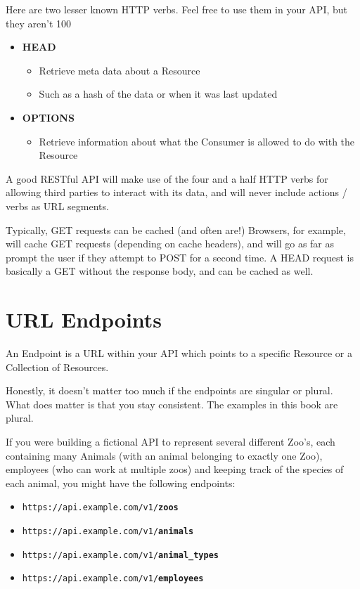 \documentclass{book}
\begin{document}
Here are two lesser known HTTP verbs. Feel free to use them in your API, but they aren't 100%

\begin{itemize}
\item \textbf{HEAD}
    \begin{itemize}
    \item Retrieve meta data about a Resource
    \item Such as a hash of the data or when it was last updated
    \end{itemize}
\item \textbf{OPTIONS}
    \begin{itemize}
    \item Retrieve information about what the Consumer is allowed to do with the Resource
    \end{itemize}
\end{itemize}

A good RESTful API will make use of the four and a half HTTP verbs for allowing third parties to interact with its data, and will never include actions / verbs as URL segments.

Typically, GET requests can be cached (and often are!) Browsers, for example, will cache GET requests (depending on cache headers), and will go as far as prompt the user if they attempt to POST for a second time. A HEAD request is basically a GET without the response body, and can be cached as well.


\chapter{URL Endpoints}

An Endpoint is a URL within your API which points to a specific Resource or a Collection of Resources.

Honestly, it doesn't matter too much if the endpoints are singular or plural. What does matter is that you stay consistent. The examples in this book are plural.

If you were building a fictional API to represent several different Zoo's, each containing many Animals (with an animal belonging to exactly one Zoo), employees (who can work at multiple zoos) and keeping track of the species of each animal, you might have the following endpoints:

\begin{itemize}
\item \texttt{https://api.example.com/v1/\textbf{zoos}}
\item \texttt{https://api.example.com/v1/\textbf{animals}}
\item \texttt{https://api.example.com/v1/\textbf{animal\_types}}
\item \texttt{https://api.example.com/v1/\textbf{employees}}
\end{itemize}
\end{document}
